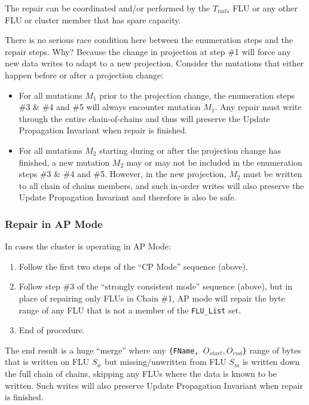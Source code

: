 \documentclass[preprint,10pt]{sigplanconf}
\begin{document}
The repair can be coordinated and/or performed by the $T_{tails}$ FLU
or any other FLU or cluster member that has spare capacity.

There is no serious race condition here between the enumeration steps
and the repair steps.  Why?  Because the change in projection at
step \#1 will force any new data writes to adapt to a new projection.
Consider the mutations that either happen before or after a projection
change:

\begin{itemize}

\item For all mutations $M_1$ prior to the projection change, the
  enumeration steps \#3 \& \#4 and \#5 will always encounter mutation
  $M_1$.  Any repair must write through the entire chain-of-chains and
  thus will preserve the Update Propagation Invariant when repair is
  finished.

\item For all mutations $M_2$ starting during or after the projection
  change has finished, a new mutation $M_2$ may or may not be included in the
  enumeration steps \#3 \& \#4 and \#5.
  However, in the new projection, $M_2$ must be
  written to all chain of chains members, and such
  in-order writes will also preserve the Update
  Propagation Invariant and therefore is also be safe.

\end{itemize}

\subsubsection{Repair in AP Mode}

In cases the cluster is operating in AP Mode:

\begin{enumerate}
\item Follow the first two steps of the ``CP Mode''
  sequence (above).
\item Follow step \#3 of the ``strongly consistent mode'' sequence
  (above), but in place of repairing only FLUs in Chain \#1, AP mode
  will repair the byte range of any FLU that is not a member of the
  {\tt FLU\_List} set.
\item End of procedure.
\end{enumerate}

The end result is a huge ``merge'' where any
{\tt \{FName, $O_{start}, O_{end}$\}} range of bytes that is written
on FLU $S_w$ but missing/unwritten from FLU $S_m$ is written down the full chain
of chains, skipping any FLUs where the data is known to be written.
Such writes will also preserve Update Propagation Invariant when
repair is finished.
\end{document}
